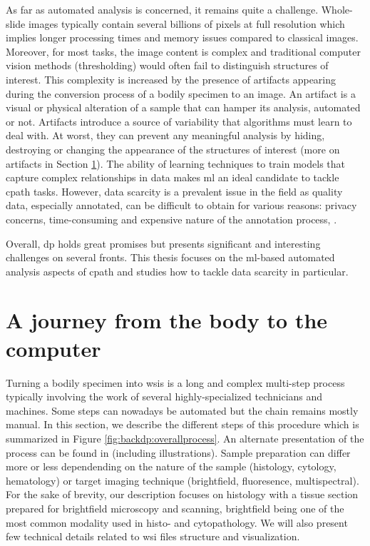 As far as automated analysis is concerned, it remains quite a challenge. Whole-slide images typically contain several billions of pixels at full resolution which implies longer processing times and memory issues compared to classical images. Moreover, for most tasks, the image content is complex and traditional computer vision methods (\eg thresholding) would often fail to distinguish structures of interest. This complexity is increased by the presence of artifacts \parencite{taqi2018review} appearing during the conversion process of a bodily specimen to an image. An artifact is a visual or physical alteration of a sample that can hamper its analysis, automated or not. Artifacts introduce a source of variability that algorithms must learn to deal with. At worst, they can prevent any meaningful analysis by hiding, destroying or changing the appearance of the structures of interest (more on artifacts in Section \ref{sec:backdp:wsi}). The ability of learning techniques to train models that capture complex relationships in data makes \acrlong{ml} an ideal candidate to tackle \acrlong{cpath} tasks. However, data scarcity is a prevalent issue in the field as quality data, especially annotated, can be difficult to obtain for various reasons: privacy concerns, time-consuming and expensive nature of the annotation process, \etc.     

Overall, \acrlong{dp} holds great promises but presents significant and interesting challenges on several fronts. This thesis focuses on the \acrshort{ml}-based automated analysis aspects of \acrlong{cpath} and studies how to tackle data scarcity in particular.

\section{A journey from the body to the computer}
\label{sec:backdp:wsi}

Turning a bodily specimen into \acrlong{wsi}s is a long and complex multi-step process typically involving the work of several highly-specialized technicians and machines. Some steps can nowadays be automated but the chain remains mostly manual. In this section, we describe the different steps of this procedure which is summarized in Figure \ref{fig:backdp:overallprocess}. An alternate presentation of the process can be found in \parencite{mccann2014automated} (including illustrations). Sample preparation can differ more or less dependending on the nature of the sample (\eg histology, cytology, hematology) or target imaging technique (\eg brightfield, fluoresence, multispectral). For the sake of brevity, our description focuses on histology with a tissue section prepared for brightfield microscopy and scanning, brightfield being one of the most common modality used in histo- and cytopathology. We will also present few technical details related to \acrshort{wsi} files structure and visualization. 

